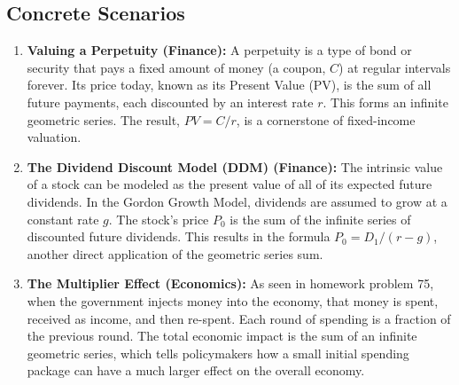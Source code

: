 \documentclass{article}
\begin{document}
\subsection{Concrete Scenarios}
\begin{enumerate}
    \item \textbf{Valuing a Perpetuity (Finance):} A perpetuity is a type of bond or security that pays a fixed amount of money (a coupon, $C$) at regular intervals forever. Its price today, known as its Present Value (PV), is the sum of all future payments, each discounted by an interest rate $r$. This forms an infinite geometric series. The result, $PV = C/r$, is a cornerstone of fixed-income valuation.
    \item \textbf{The Dividend Discount Model (DDM) (Finance):} The intrinsic value of a stock can be modeled as the present value of all of its expected future dividends. In the Gordon Growth Model, dividends are assumed to grow at a constant rate $g$. The stock's price $P_0$ is the sum of the infinite series of discounted future dividends. This results in the formula $P_0 = D_1 / (r-g)$, another direct application of the geometric series sum.
    \item \textbf{The Multiplier Effect (Economics):} As seen in homework problem 75, when the government injects money into the economy, that money is spent, received as income, and then re-spent. Each round of spending is a fraction of the previous round. The total economic impact is the sum of an infinite geometric series, which tells policymakers how a small initial spending package can have a much larger effect on the overall economy.
\end{enumerate}
\end{document}
